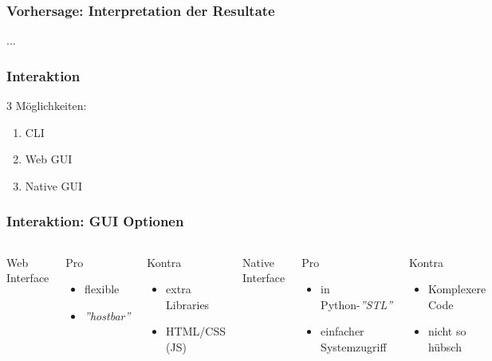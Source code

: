 \documentclass{beamer}
\begin{document}
    \begin{frame}
        \frametitle{Vorhersage: Interpretation der Resultate}
        ...
    \end{frame}
    \begin{frame}
        \frametitle{Interaktion}
        3 Möglichkeiten:
        \begin{enumerate}
            \item CLI
            \item Web GUI
            \item Native GUI
        \end{enumerate}
    \end{frame}
    \begin{frame}
        \frametitle{Interaktion: GUI Optionen}
        \begin{columns}
            Web Interface
            \begin{exampleblock}{Pro}
                \begin{itemize}
                    \item flexible
                    \item \textit{''hostbar''}
                \end{itemize}
            \end{exampleblock}
            \begin{alertblock}{Kontra}
                \begin{itemize}
                    \item extra Libraries
                    \item HTML/CSS (JS)
                \end{itemize}
            \end{alertblock}
            
            Native Interface
            \begin{exampleblock}{Pro}
                \begin{itemize}
                    \item in Python-\textit{''STL''}
                    \item einfacher Systemzugriff
                \end{itemize}
            \end{exampleblock}
            \begin{alertblock}{Kontra}
                \begin{itemize}
                    \item Komplexere Code
                    \item nicht so hübsch
                \end{itemize}				
            \end{alertblock}	
        \end{columns}
    \end{frame}
\end{document}
